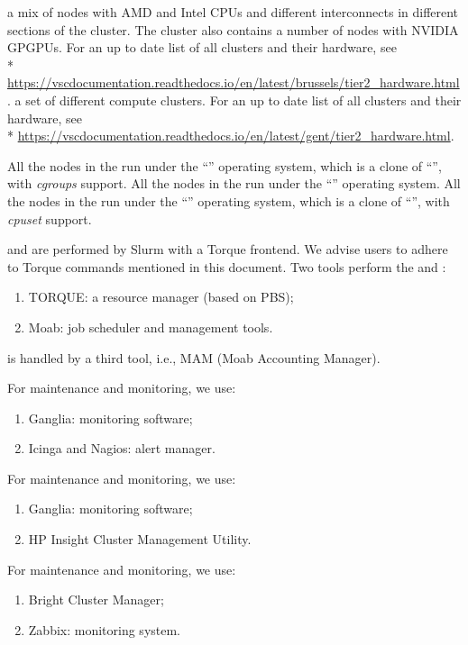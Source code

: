 \fi
\ifbrussel
  a mix of nodes with AMD and Intel CPUs and different interconnects in different sections of the cluster. The cluster also contains a number of nodes with NVIDIA GPGPUs.  For an up to date list of all clusters and their hardware, see\\*
  \url{https://vscdocumentation.readthedocs.io/en/latest/brussels/tier2_hardware.html}.
\fi
\ifgent
  a set of different compute clusters. For an up to date list of all clusters and their hardware, see\\*
  \url{https://vscdocumentation.readthedocs.io/en/latest/gent/tier2_hardware.html}.
\fi

\ifantwerpen
All the nodes in the \hpc run under the ``\operatingsystem'' operating
system, which is a clone of ``\operatingsystembase'',
with \emph{cgroups} support.
\fi
\ifleuven
All the nodes in the \hpc run under the ``\operatingsystem'' operating system.
\fi
\ifbrussel
All the nodes in the \hpc run under the ``\operatingsystem'' operating
system, which is a clone of ``\operatingsystembase'',
with \emph{cpuset} support.
\fi

\ifgent
{} and  are performed by Slurm with a Torque frontend. We advise users to adhere to Torque commands mentioned in this document.
\else
Two tools perform the  and :
\begin{enumerate}
  \item  TORQUE: a resource manager (based on PBS);
  \item  Moab: job scheduler and management tools.
\end{enumerate}
\fi

\ifantwerpen
\fi
\ifleuven
{} is handled by a third tool, i.e., MAM (Moab Accounting
Manager).
\fi

\ifantwerpen
    For maintenance and monitoring, we use:
    \begin{enumerate}
      \item  Ganglia: monitoring software;
      \item  Icinga and Nagios: alert manager.
    \end{enumerate}
\fi
\ifleuven
    For maintenance and monitoring, we use:
    \begin{enumerate}
      \item  Ganglia: monitoring software;
      \item  HP Insight Cluster Management Utility.
    \end{enumerate}
\fi
\ifbrussel
    For maintenance and monitoring, we use:
    \begin{enumerate}
      \item  Bright Cluster Manager;
      \item  Zabbix: monitoring system.
    \end{enumerate}
\fi


